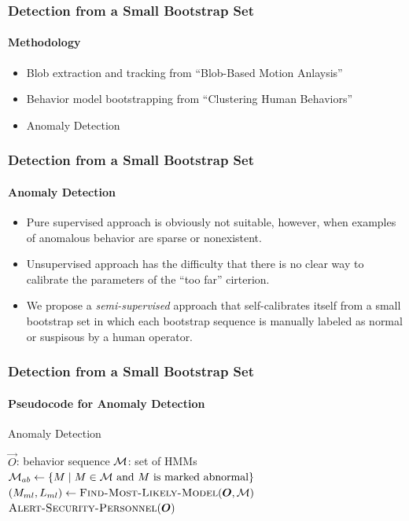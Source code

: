 
\begin{frame}
    \frametitle{Detection from a Small Bootstrap Set}
    \framesubtitle{Methodology}

    \begin{itemize}
        \item Blob extraction and tracking from ``Blob-Based Motion Anlaysis''
        \item Behavior model bootstrapping from ``Clustering Human Behaviors''
        \item Anomaly Detection
    \end{itemize}

\end{frame}


\begin{frame}
    \frametitle{Detection from a Small Bootstrap Set}
    \framesubtitle{Anomaly Detection}

    \begin{itemize}
        \item Pure supervised approach is obviously not suitable, however, 
            when examples of anomalous behavior are sparse or nonexistent.
        \item Unsupervised approach has the difficulty that there is no clear 
            way to calibrate the parameters of the ``too far'' cirterion.
        \item We propose a {\em semi-supervised} approach that self-calibrates 
            itself from a small bootstrap set in which each bootstrap sequence 
            is manually labeled as normal or suspisous by a human operator.
    \end{itemize}

\end{frame}


\begin{frame}
    \frametitle{Detection from a Small Bootstrap Set}
    \framesubtitle{Pseudocode for Anomaly Detection}

    \begin{algorithm}[H]
        \caption{Anomaly Detection}
        \begin{algorithmic}
            \REQUIRE $\vec{O}$: behavior sequence
            \REQUIRE ${\cal M}$: set of HMMs
            \STATE ${\cal M}_{ab} \gets \{ M \mid M \in {\cal M} \text{~and $M$ is marked abnormal} \}$
            \STATE $( M_{ml}, L_{ml} ) \gets \textsc{Find-Most-Likely-Model}(\vec{O}, {\cal M})$
                \STATE $\textsc{Alert-Security-Personnel}(\vec{O})$
            \ENDIF
        \end{algorithmic}
    \end{algorithm}

\end{frame}

